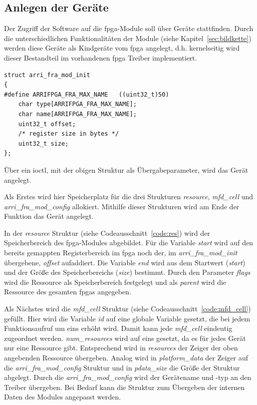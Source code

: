 
\subsection{Anlegen der Geräte}
Der Zugriff der Software auf die \ac{fpga}-Module soll über Geräte stattfinden. Durch die unterschiedlichen Funktionalitäten der Module (siehe Kapitel~\ref{sec:bildkette}) werden diese Geräte als Kindgeräte vom \ac{fpga} angelegt, d.h. kernelseitig wird dieser Bestandteil im vorhandenen \ac{fpga} Treiber implementiert. 

\begin{lstfloat}
\begin{lstlisting}
struct arri_fra_mod_init 
{
#define ARRIFPGA_FRA_MAX_NAME   ((uint32_t)50)
	char type[ARRIFPGA_FRA_MAX_NAME];
	char name[ARRIFPGA_FRA_MAX_NAME];
	uint32_t offset;
	/* register size in bytes */
	uint32_t size;
};
\end{lstlisting}
\end{lstfloat}

Über ein \ac{ioctl}, mit der obigen Struktur als Übergabeparameter, wird das Gerät angelegt. 


Als Erstes wird hier Speicherplatz für die drei Strukturen \textit{resource}, \textit{mfd\_cell} und \textit{arri\_fra\_mod\_config} allokiert. Mithilfe dieser Strukturen wird am Ende der Funktion das Gerät angelegt.


In der \textit{resource} Struktur (siehe Codeausschnitt~\ref{code:res}) wird der Speicherbereich des \ac{fpga}-Modules abgebildet. Für die Variable \textit{start} wird auf den bereits gemappten Registerbereich im \ac{fpga} noch der, im \textit{arri\_fra\_mod\_init} übergebene, \textit{offset} aufaddiert. Die Variable \textit{end} wird aus dem Startwert (\textit{start}) und der Größe des Speicherbereichs (\textit{size}) bestimmt. Durch den Parameter \textit{flags} wird die Ressource als Speicherbereich festgelegt und als \textit{parent} wird die Ressource des gesamten \ac{fpga}s angegeben.


Als Nächstes wird die \textit{mfd\_cell} Struktur (siehe Codeausschnitt~\ref{code:mfd_cell}) gefüllt. Hier wird die Variable \textit{id} auf eine globale Variable gesetzt, die bei jedem Funktionsaufruf um eins erhöht wird. Damit kann jede \textit{mfd\_cell} eindeutig zugeordnet werden. \textit{num\_resources} wird auf eins gesetzt, da es für jedes Gerät nur eine Ressource gibt. Entsprechend wird in  \textit{resources} der Zeiger der oben angebenden Ressource übergeben. Analog wird in \textit{platform\_data} der Zeiger auf die \textit{arri\_fra\_mod\_config} Struktur und in \textit{pdata\_size} die Größe der Struktur abgelegt.
Durch die \textit{arri\_fra\_mod\_config} wird der Gerätename und -typ an den Treiber übergeben. Bei Bedarf kann die Struktur zum Übergeben der internen Daten des Modules angepasst werden.

